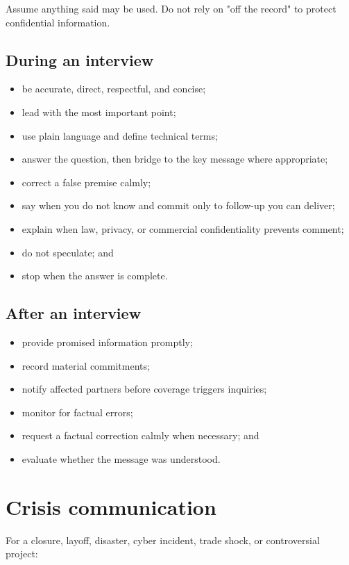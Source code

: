 \documentclass[11pt,letterpaper,oneside,openany]{book}
\begin{document}
Assume anything said may be used. Do not rely on "off the record" to protect confidential information.


\subsection[During an interview]{During an interview}
\begin{itemize}
\item be accurate, direct, respectful, and concise;
\item lead with the most important point;
\item use plain language and define technical terms;
\item answer the question, then bridge to the key message where appropriate;
\item correct a false premise calmly;
\item say when you do not know and commit only to follow-up you can deliver;
\item explain when law, privacy, or commercial confidentiality prevents comment;
\item do not speculate; and
\item stop when the answer is complete.
\end{itemize}


\subsection[After an interview]{After an interview}
\begin{itemize}
\item provide promised information promptly;
\item record material commitments;
\item notify affected partners before coverage triggers inquiries;
\item monitor for factual errors;
\item request a factual correction calmly when necessary; and
\item evaluate whether the message was understood.
\end{itemize}


\section[Crisis communication]{Crisis communication}
For a closure, layoff, disaster, cyber incident, trade shock, or controversial project:
\end{document}
